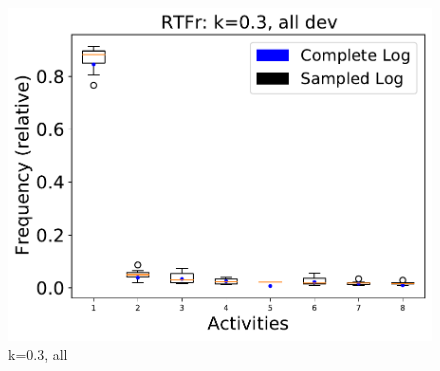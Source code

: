 \documentclass[landscape]{article}
\begin{document}
\begin{figure}[!htb]
\begin{minipage}{0.2\textwidth}
		\includegraphics[width=1.0\textwidth]{../RTFM_model2/RTFM_model2_deviationsApprox_0.3_NONALIGNING_ALL.pdf}
		\caption{k=0.3, all}
	\end{minipage}
\end{figure}
\newpage
\end{document}
